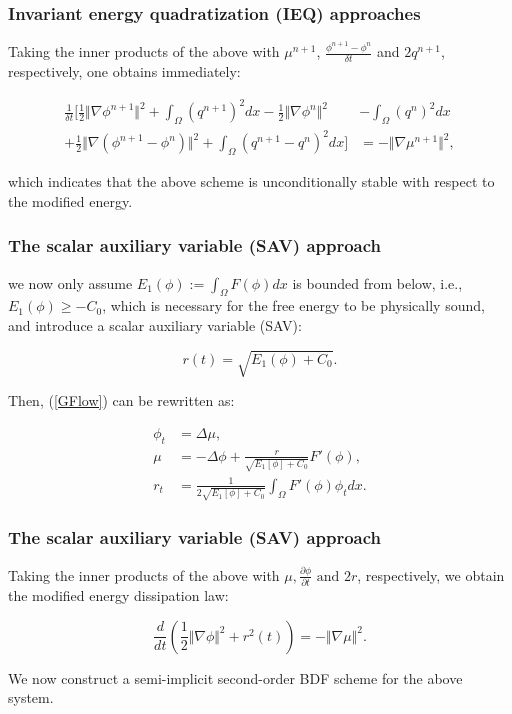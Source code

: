\documentclass{beamer}
\begin{document}
    \begin{frame}
    \frametitle{Invariant energy quadratization (IEQ) approaches}

Taking the inner products of the above with $\mu^{n+1}$, $\frac{\phi^{n+1}-\phi^n}{\delta t}$ and $2q^{n+1}$, respectively, one obtains immediately:

\begin{equation}\label{haosan}
  \begin{split}
\frac{1}{\delta t}[\frac{1}{2}\Vert\nabla\phi^{n+1}\Vert^2+\int_{\Omega}{(q^{n+1})}^2dx-\frac{1}{2}\Vert\nabla\phi^n\Vert^2&-\int_{\Omega}{(q^n)}^2dx\\
+\frac{1}{2}\Vert\nabla(\phi^{n+1}-\phi^n)\Vert^2+\int_{\Omega}(q^{n+1}-q^n)^2dx]&=-\Vert\nabla\mu^{n+1}\Vert^2,
\end{split}
\end{equation}

which indicates that the above scheme is unconditionally stable with respect to the modified energy.

    \end{frame}
    \begin{frame}
    \frametitle{The scalar auxiliary variable (SAV) approach}

we now only assume $E_1(\phi):=\int_{\Omega}F(\phi)dx$ is bounded from below, i.e., $E_1(\phi)\geq−C_0$, which is necessary for the free energy to be physically sound, and
introduce a scalar auxiliary variable (SAV):

$$
r(t)=\sqrt{E_1(\phi)+C_0}.
$$

Then, (\ref{GFlow}) can be rewritten as:

\begin{equation}\label{SAV}
  \begin{split}
\phi_t&=\Delta\mu,\\
\mu&=-\Delta\phi+\frac{r}{\sqrt{E_1[\phi]+C_0}}F'(\phi),\\
r_t&=\frac{1}{2\sqrt{E_1[\phi]+C_0}}\int_{\Omega}F'(\phi)\phi_t dx.
  \end{split}
\end{equation}

    \end{frame}
    \begin{frame}
\frametitle{The scalar auxiliary variable (SAV) approach}

Taking the inner products of the above with $\mu, \frac{\partial\phi}{\partial t}\text{ and }2r$, respectively, we obtain the modified energy dissipation law:

$$
\frac{d}{dt}(\frac{1}{2}\Vert\nabla\phi\Vert^2+r^2(t))=-\Vert\nabla\mu\Vert^2.
$$

We now construct a semi-implicit second-order BDF scheme for the above system.

    \end{frame}
\end{document}
